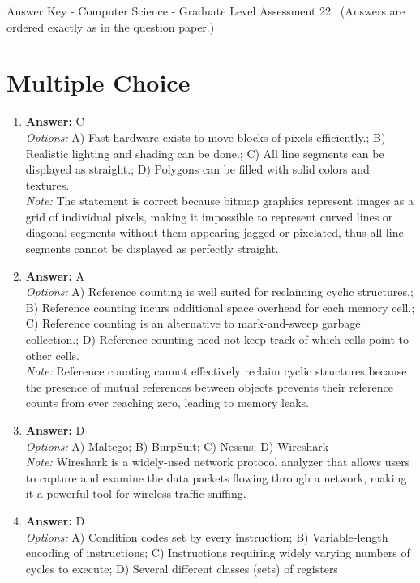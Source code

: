 \documentclass[12pt]{article}
\begin{document}
\begin{center}
Answer Key - Computer Science - Graduate Level Assessment 22 \
\small (Answers are ordered exactly as in the question paper.)
\end{center}

\section*{Multiple Choice}
\begin{enumerate}[label=\arabic*.]
\item \textbf{Answer:} C
\\ \textit{Options:} A) Fast hardware exists to move blocks of pixels efficiently.; B) Realistic lighting and shading can be done.; C) All line segments can be displayed as straight.; D) Polygons can be filled with solid colors and textures.
\\ \textit{Note:} The statement is correct because bitmap graphics represent images as a grid of individual pixels, making it impossible to represent curved lines or diagonal segments without them appearing jagged or pixelated, thus all line segments cannot be displayed as perfectly straight.
\item \textbf{Answer:} A
\\ \textit{Options:} A) Reference counting is well suited for reclaiming cyclic structures.; B) Reference counting incurs additional space overhead for each memory cell.; C) Reference counting is an alternative to mark-and-sweep garbage collection.; D) Reference counting need not keep track of which cells point to other cells.
\\ \textit{Note:} Reference counting cannot effectively reclaim cyclic structures because the presence of mutual references between objects prevents their reference counts from ever reaching zero, leading to memory leaks.
\item \textbf{Answer:} D
\\ \textit{Options:} A) Maltego; B) BurpSuit; C) Nessus; D) Wireshark
\\ \textit{Note:} Wireshark is a widely-used network protocol analyzer that allows users to capture and examine the data packets flowing through a network, making it a powerful tool for wireless traffic sniffing.
\item \textbf{Answer:} D
\\ \textit{Options:} A) Condition codes set by every instruction; B) Variable-length encoding of instructions; C) Instructions requiring widely varying numbers of cycles to execute; D) Several different classes (sets) of registers

\end{enumerate}
\end{document}
